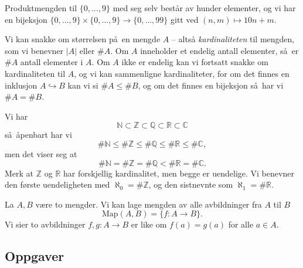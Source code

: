 \begin{example}
    Produktmengden til $\{0,\dots,9\}$ med seg selv består av hunder elementer,
    og vi har en bijeksjon $\{0,\dots,9\}\times\{0,\dots,9\}\to \{0,\dots,99\}$
    gitt ved $(n, m)\mapsto 10n + m$.
\end{example}

\begin{definition}
    Vi kan snakke om størrelsen på en mengde $A$ -- altså \textit{kardinaliteten}
    til mengden, som vi benevner $|A|$ eller $\# A$.
    Om $A$ inneholder et endelig antall elementer,
    så er $\# A$ antall elementer i $A$.
    Om $A$ ikke er endelig kan vi fortsatt snakke om kardinaliteten til $A$,
    og vi kan sammenligne kardinaliteter,
    for om det finnes en inklusjon $A\hookrightarrow B$
    kan vi si $\# A\leq \# B$,
    og om det finnes en bijeksjon så har vi $\# A = \# B$.
\end{definition}

\begin{example}
    Vi har
    \[
        \mathbb N
        \subset \mathbb Z
        \subset \mathbb Q
        \subset \mathbb R
        \subset \mathbb C
    \]
    så åpenbart har vi
    \[
        \#\mathbb N
        \leq \#\mathbb Z
        \leq \#\mathbb Q
        \leq \#\mathbb R
        \leq \#\mathbb C,
    \]
    men det viser seg at
    \[
        \#\mathbb N
        = \#\mathbb Z
        = \#\mathbb Q
        < \#\mathbb R
        = \#\mathbb C.
    \]
    Merk at $\mathbb Z$ og $\mathbb R$ har forskjellig kardinalitet,
    men begge er uendelige.
    Vi benevner den første uendeligheten med $\aleph_0 = \#\mathbb Z$,
    og den sistnevnte som $\aleph_1 = \#\mathbb R$.
\end{example}

\begin{example}
    La $A, B$ være to mengder.
    Vi kan lage mengden av alle avbildninger fra $A$ til $B$
    \[
        \mathrm{Map}(A,B) = \{f\colon A\to B\}.
    \]
    Vi sier to avbildninger $f,g\colon A\to B$
    er like om $f(a) = g(a)$ for alle $a\in A$.
\end{example}

\subsection{Oppgaver}

